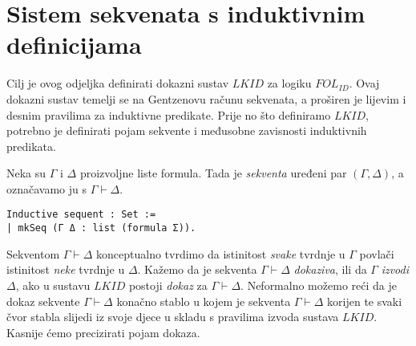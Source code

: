 \chapter{Sistem sekvenata s induktivnim definicijama}\label{sec:sistem-sekvenata}
Cilj je ovog odjeljka definirati dokazni sustav \(\mathit{LKID}\) za logiku \(\mathit{FOL_{ID}}\).
Ovaj dokazni sustav temelji se na Gentzenovu računu sekvenata, a proširen je lijevim i desnim pravilima za induktivne predikate.
Prije no što definiramo \(\mathit{LKID}\), potrebno je definirati pojam sekvente i međusobne zavisnosti induktivnih predikata.

\begin{definition}
  Neka su \(\Gamma\) i \(\Delta\) proizvoljne liste formula.
  Tada je \textit{sekventa} uređeni par \((\Gamma,\Delta)\), a označavamo ju s \(\Gamma \vdash \Delta\).
\begin{verbatim}
Inductive sequent : Set :=
| mkSeq (Γ Δ : list (formula Σ)).
\end{verbatim}
\end{definition}
\noindent Sekventom \(\Gamma \vdash \Delta\) konceptualno tvrdimo da istinitost \textit{svake}
tvrdnje u \(\Gamma\) povlači istinitost \textit{neke} tvrdnje u \(\Delta\).
Kažemo da je sekventa \(\Gamma \vdash \Delta\) \textit{dokaziva}, ili da \(\Gamma\) \textit{izvodi} \(\Delta\), ako u sustavu \(\mathit{LKID}\) postoji \textit{dokaz} za \(\Gamma \vdash \Delta\).
Neformalno možemo reći da je dokaz sekvente \(\Gamma \vdash \Delta\) konačno stablo u kojem je sekventa \(\Gamma \vdash \Delta\) korijen
te svaki čvor stabla slijedi iz svoje djece u skladu s pravilima izvoda sustava \(\mathit{LKID}\).
Kasnije ćemo precizirati pojam dokaza.

